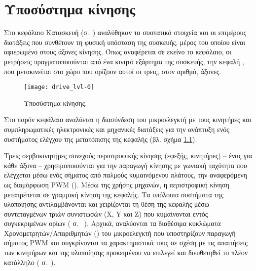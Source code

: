 
\chapter{Υποσύστημα κίνησης}
\label{ch:motor}

Στο κεφάλαιο Κατασκευή (σ.~\pageref{ch:construction}) αναλύθηκαν τα συστατικά
στοιχεία και οι επιμέρους διατάξεις που συνθέτουν τη φυσική υπόσταση της
συσκευής, μέρος του οποίου είναι αφιερωμένο στους
άξονες κίνησης. Όπως αναφέρεται σε εκείνο το κεφάλαιο, οι μετρήσεις
πραγματοποιούνται από ένα κινητό εξάρτημα της συσκευής, την κεφαλή
, που μετακινείται στο χώρο που ορίζουν αυτοί οι τρεις, στον
αριθμό, άξονες.

\begin{figure}
    \caption{Υποσύστημα κίνησης.\label{fig:motor:lvl-0}}
    \begin{center}
    \texttt{[image: drive\_lvl-0]}
    \end{center}
\end{figure}

Στο παρόν κεφάλαιο αναλύεται η διασύνδεση του μικροελεγκτή με τους κινητήρες και
συμπληρωματικές ηλεκτρονικές και μηχανικές διατάξεις για την ανάπτυξη ενός
συστήματος ελέγχου της μετατόπισης της κεφαλής (βλ. σχήμα
\ref{fig:motor:lvl-0}).

Τρεις σερβοκινητήρες συνεχούς περιστροφικής κίνησης (εφεξής, κινητήρες) -- ένας
για κάθε άξονα -- χρησιμοποιούνται για την παραγωγή κίνησης με γωνιακή ταχύτητα
που ελέγχεται μέσω ενός σήματος από παλμούς κυμαινόμενου πλάτους, την
αναφερόμενη ως διαμόρφωση PWM (). Μέσω της χρήσης
μηχανών, η περιστροφική κίνηση μετατρέπεται σε
γραμμική κίνηση της κεφαλής.
Τα υπόλοιπα συστήματα της υλοποίησης αντιλαμβάνονται και χειρίζονται τη θέση
της κεφαλής μέσω συντεταγμένων τριών συνιστωσών (X, Y και Z) που κυμαίνονται
εντός συγκεκριμένων ορίων ( σ.~%
\pageref{sec:motor:coordinates}).
Αρχικά, αναλύονται
τα διαθέσιμα κυκλώματα Χρονομετρητών\slash{}Απαριθμητών () του μικροελεγκτή που υποστηρίζουν παραγωγή σήματος PWM και
συγκρίνονται τα χαρακτηριστικά τους σε σχέση με τις απαιτήσεις των κινητήρων και
της υλοποίησης προκειμένου να επιλεγεί και διευθετηθεί το πλέον κατάλληλο
( σ.~\pageref{sec:motor:motion}).


